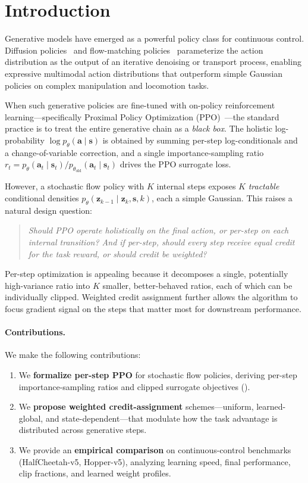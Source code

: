 \section{Introduction}
\label{sec:intro}

Generative models have emerged as a powerful policy class for continuous
control.  Diffusion policies~\citep{chi2023diffusion} and flow-matching
policies~\citep{lipman2023flow} parameterize the action distribution as the
output of an iterative denoising or transport process, enabling expressive
multimodal action distributions that outperform simple Gaussian policies on
complex manipulation and locomotion tasks.

When such generative policies are fine-tuned with on-policy reinforcement
learning---specifically Proximal Policy Optimization
(PPO)~\citep{schulman2017ppo}---the standard practice is to treat the entire
generative chain as a \emph{black box}.  The holistic log-probability
$\log p_\theta(\mathbf{a}\mid\mathbf{s})$ is obtained by summing per-step
log-conditionals and a change-of-variable correction, and a single
importance-sampling ratio $r_t = p_\theta(\mathbf{a}_t\mid\mathbf{s}_t) /
p_{\theta_{\text{old}}}(\mathbf{a}_t\mid\mathbf{s}_t)$ drives the PPO
surrogate loss.

However, a stochastic flow policy with $K$ internal steps exposes $K$
\emph{tractable} conditional densities
$p_\theta(\mathbf{z}_{k-1}\mid\mathbf{z}_k,\mathbf{s},k)$, each a simple
Gaussian.  This raises a natural design question:

\begin{quote}
\emph{Should PPO operate holistically on the final action, or per-step on each
internal transition?  And if per-step, should every step receive equal credit
for the task reward, or should credit be weighted?}
\end{quote}

Per-step optimization is appealing because it decomposes a single, potentially
high-variance ratio into $K$ smaller, better-behaved ratios, each of which can
be individually clipped.  Weighted credit assignment further allows the
algorithm to focus gradient signal on the steps that matter most for downstream
performance.

\paragraph{Contributions.}
We make the following contributions:
\begin{enumerate}[leftmargin=*,nosep]
  \item We \textbf{formalize per-step PPO} for stochastic flow policies,
        deriving per-step importance-sampling ratios and clipped surrogate
        objectives ().
  \item We \textbf{propose weighted credit-assignment} schemes---uniform,
        learned-global, and state-dependent---that modulate how the task
        advantage is distributed across generative steps.
  \item We provide an \textbf{empirical comparison} on continuous-control
        benchmarks (HalfCheetah-v5, Hopper-v5), analyzing learning speed,
        final performance, clip fractions, and learned weight profiles.
\end{enumerate}
